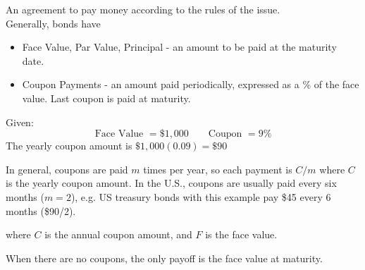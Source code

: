 An agreement to pay money according to the rules of the issue.
\\Generally, bonds have\begin{itemize}
    \item Face Value, Par Value, Principal - an amount to be paid at the maturity date.
    \item Coupon Payments - an amount paid periodically, expressed as a \% of the face value. Last coupon is paid at maturity.
\end{itemize}

\begin{example}
    Given:
    \[\text{Face Value } = \$1,000 \qquad \text{Coupon } = 9\%\]
    The yearly coupon amount is $\$1,000(0.09) = \$90$
\end{example}
In general, coupons are paid $m$ times per year, so each payment is $C/m$ where $C$ is the yearly coupon amount. In the U.S., coupons are usually paid every six months ($m=2$), e.g. US treasury bonds with this example pay \$45 every 6 months (\$90/2).

\begin{center}
\end{center}

where $C$ is the annual coupon amount, and $F$ is the face value.

When there are no coupons, the only payoff is the face value at maturity.

\begin{center}
\end{center}

